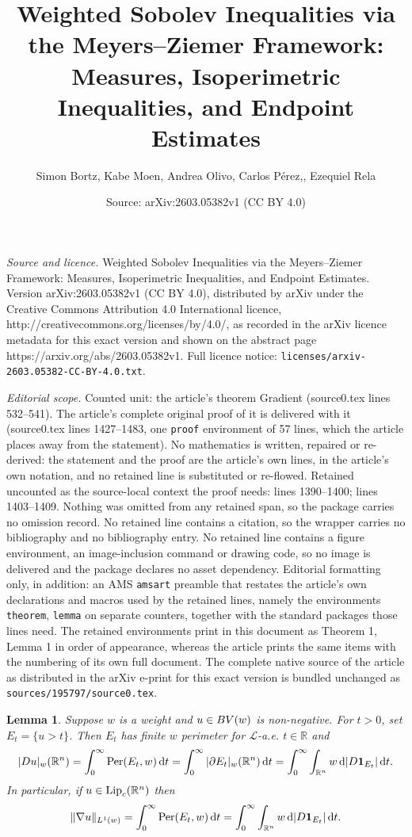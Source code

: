 \documentclass[10pt,a4paper]{amsart}
\title{Weighted Sobolev Inequalities via the Meyers--Ziemer Framework: Measures, Isoperimetric Inequalities, and Endpoint Estimates}
\author{Simon Bortz, Kabe Moen, Andrea Olivo, Carlos P\'erez,, Ezequiel Rela}
\date{Source: arXiv:2603.05382v1 (CC BY 4.0)}
\newtheorem{lemma}{Lemma}
\newcommand{\BV}{\textup{BV}}
\newcommand{\Leb}{\mathcal{L}}
\DeclareMathOperator{\Lip}{\textup{Lip}}
\newcommand{\Lup}{\textup{L}}
\DeclareMathOperator{\Per}{\textup{Per}}
\newcommand{\R}{\mathbb R}
\begin{document}
\maketitle

\noindent\emph{Source and licence.} Weighted Sobolev Inequalities via the Meyers--Ziemer Framework: Measures, Isoperimetric Inequalities, and Endpoint Estimates. Version arXiv:2603.05382v1 (CC BY 4.0), distributed by arXiv under the Creative Commons Attribution 4.0 International licence, http://creativecommons.org/licenses/by/4.0/, as recorded in the arXiv licence metadata for this exact version and shown on the abstract page https://arxiv.org/abs/2603.05382v1. Full licence notice: \texttt{licenses/arxiv-2603.05382-CC-BY-4.0.txt}.\par\smallskip

\noindent\textit{Editorial scope.} Counted unit: the article's theorem Gradient (source0.tex lines 532--541). The article's complete original proof of it is delivered with it (source0.tex lines 1427--1483, one \texttt{proof} environment of 57 lines, which the article places away from the statement). No mathematics is written, repaired or re-derived: the statement and the proof are the article's own lines, in the article's own notation, and no retained line is substituted or re-flowed.  Retained uncounted as the source-local context the proof needs: lines 1390--1400; lines 1403--1409.  Nothing was omitted from any retained span, so the package carries no omission record.  No retained line contains a citation, so the wrapper carries no bibliography and no bibliography entry.  No retained line contains a figure environment, an image-inclusion command or drawing code, so no image is delivered and the package declares no asset dependency.  Editorial formatting only, in addition: an AMS \texttt{amsart} preamble that restates the article's own declarations and macros used by the retained lines, namely the environments \texttt{theorem}, \texttt{lemma} on separate counters, together with the standard packages those lines need.  The retained environments print in this document as Theorem 1, Lemma 1 in order of appearance, whereas the article prints the same items with the numbering of its own full document.  The complete native source of the article as distributed in the arXiv e-print for this exact version is bundled unchanged as \texttt{sources/195797/source0.tex}.
\begin{lemma}\label{coarea}
Suppose $w$ is a weight and $u\in \BV(w)$ is non-negative. For $t>0$, set $E_t=\{u>t\}$. Then $E_t$ has finite $w$ perimeter for $\Leb$-a.e. $t\in \R$ and
\[
|Du|_w(\R^n)
=\int_0^\infty \Per(E_t,w)\,\mathrm dt
=\int_0^\infty |\partial E_t|_w(\R^n)\,\mathrm dt
=\int_0^\infty \int_{\R^n} w\,\mathrm d|D\mathbf 1_{E_t}|\,\mathrm dt.
\]
In particular, if $u\in \Lip_c(\R^n)$ then
$$\|\nabla u\|_{\Lup^1(w)}=\int_0^\infty\Per(E_t,w)\,\mathrm dt=\int_0^\infty \int_{\R^n} w\,\mathrm d|D\mathbf 1_{E_t}|\,\mathrm dt.$$
\end{lemma}
\end{document}
